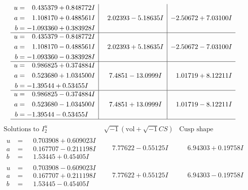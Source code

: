 \documentclass[1p]{elsarticle_modified}
\theoremstyle{definition}
\newcommand{\I}{\sqrt{-1}}
\begin{document}
$$\begin{array}{c|c|c}
\begin{aligned}
u &= \phantom{-}0.435379 + 0.848772 I \\
a &= \phantom{-}1.108170 + 0.488561 I \\
b &= -1.093360 + 0.383928 I\end{aligned}
 & \phantom{-}2.02393 - 5.18635 I & -2.50672 + 7.03100 I \\ \hline\begin{aligned}
u &= \phantom{-}0.435379 - 0.848772 I \\
a &= \phantom{-}1.108170 - 0.488561 I \\
b &= -1.093360 - 0.383928 I\end{aligned}
 & \phantom{-}2.02393 + 5.18635 I & -2.50672 - 7.03100 I \\ \hline\begin{aligned}
u &= \phantom{-}0.986825 + 0.374884 I \\
a &= \phantom{-}0.523680 + 1.034500 I \\
b &= -1.39544 + 0.53455 I\end{aligned}
 & \phantom{-}7.4851 - 13.0999 I & \phantom{-}1.01719 + 8.12211 I \\ \hline\begin{aligned}
u &= \phantom{-}0.986825 - 0.374884 I \\
a &= \phantom{-}0.523680 - 1.034500 I \\
b &= -1.39544 - 0.53455 I\end{aligned}
 & \phantom{-}7.4851 + 13.0999 I & \phantom{-}1.01719 - 8.12211 I\\
 \hline 
 \end{array}$$\newpage$$\begin{array}{c|c|c}  
\text{Solutions to }I^u_{2}& \I (\text{vol} + \sqrt{-1}CS) & \text{Cusp shape}\\
 \hline 
\begin{aligned}
u &= \phantom{-}0.703908 + 0.609023 I \\
a &= \phantom{-}0.167707 - 0.211198 I \\
b &= \phantom{-}1.53445 + 0.45405 I\end{aligned}
 & \phantom{-}7.77622 - 0.55125 I & \phantom{-}6.94303 + 0.19758 I \\ \hline\begin{aligned}
u &= \phantom{-}0.703908 - 0.609023 I \\
a &= \phantom{-}0.167707 + 0.211198 I \\
b &= \phantom{-}1.53445 - 0.45405 I\end{aligned}
 & \phantom{-}7.77622 + 0.55125 I & \phantom{-}6.94303 - 0.19758 I \\ \hline\begin{aligned}

\end{aligned}
\end{array}$$
\end{document}
